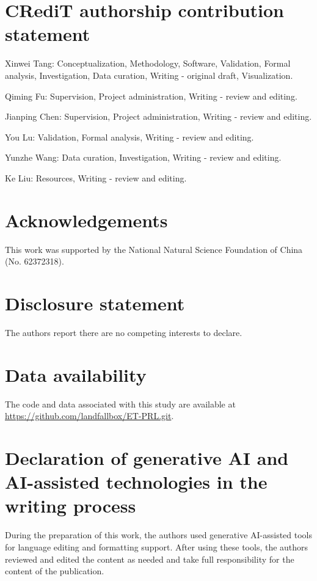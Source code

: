 \documentclass[preprint,12pt]{elsarticle}
\begin{document}
\section*{CRediT authorship contribution statement}
Xinwei Tang: Conceptualization, Methodology, Software, Validation, Formal analysis, Investigation, Data curation, Writing - original draft, Visualization.

Qiming Fu: Supervision, Project administration, Writing - review and editing.

Jianping Chen: Supervision, Project administration, Writing - review and editing.

You Lu: Validation, Formal analysis, Writing - review and editing.

Yunzhe Wang: Data curation, Investigation, Writing - review and editing.

Ke Liu: Resources, Writing - review and editing.

\section*{Acknowledgements}
This work was supported by the National Natural Science Foundation of China (No. 62372318).

\section*{Disclosure statement}
The authors report there are no competing interests to declare.

\section*{Data availability}
The code and data associated with this study are available at \url{https://github.com/landfallbox/ET-PRL.git}.

\section*{Declaration of generative AI and AI-assisted technologies in the writing process}
During the preparation of this work, the authors used generative AI-assisted tools for language editing and formatting support. After using these tools, the authors reviewed and edited the content as needed and take full responsibility for the content of the publication.
\end{document}
